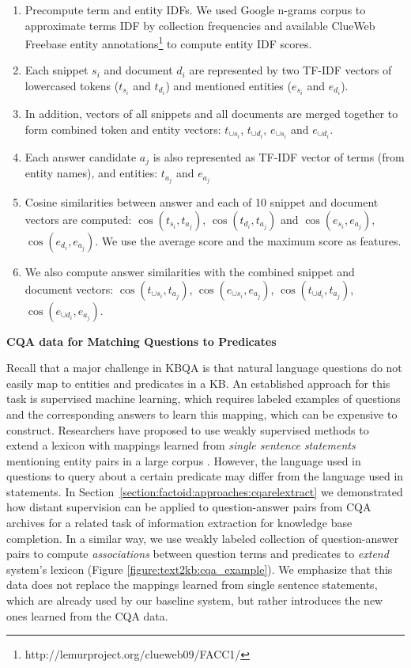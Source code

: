 \begin{enumerate}
\item Precompute term and entity IDFs. We used Google n-grams corpus to approximate terms IDF by collection frequencies and available ClueWeb Freebase entity annotations\footnote{http://lemurproject.org/clueweb09/FACC1/} to compute entity IDF scores.
\item Each snippet $s_i$ and document $d_i$ are represented by two TF-IDF vectors of lowercased tokens ($t_{s_i}$ and $t_{d_i}$) and mentioned entities ($e_{s_i}$ and $e_{d_i}$).
\item In addition, vectors of all snippets and all documents are merged together to form combined token and entity vectors: $t_{\cup s_i}$, $t_{\cup d_i}$, $e_{\cup s_i}$ and $e_{\cup d_i}$.
\item Each answer candidate $a_j$ is also represented as TF-IDF vector of terms (from entity names), and entities: $t_{a_j}$ and $e_{a_j}$
\item Cosine similarities between answer and each of 10 snippet and document vectors are computed: $\cos(t_{s_i}, t_{a_j})$, $\cos(t_{d_i}, t_{a_j})$ and $\cos(e_{s_i}, e_{a_j})$, $\cos(e_{d_i}, e_{a_j})$.
We use the average score and the maximum score as features.
\item We also compute answer similarities with the combined snippet and document vectors: $\cos(t_{\cup s_i}, t_{a_j})$, $\cos(e_{\cup s_i}, e_{a_j})$, $\cos(t_{\cup d_i}, t_{a_j})$, $\cos(e_{\cup d_i}, e_{a_j})$.
\end{enumerate}

\textbf{CQA data for Matching Questions to Predicates}

Recall that a major challenge in KBQA is that natural language questions do not easily  map to entities and predicates in a KB.
An established approach for this task is supervised machine learning, which requires labeled examples of questions and the corresponding answers to learn this mapping, which can be expensive to construct.
Researchers have proposed to use weakly supervised methods to extend a lexicon with mappings learned from \textit{single sentence statements} mentioning entity pairs in a large corpus \cite{YaoD14}.
However, the language used in questions to query about a certain predicate may differ from the language used in statements.
In Section~\ref{section:factoid:approaches:cqarelextract} we demonstrated how distant supervision can be applied to question-answer pairs from CQA archives for a related task of information extraction for knowledge base completion.
In a similar way, we use weakly labeled collection of question-answer pairs to compute {\em associations} between question terms and predicates to \textit{extend} system's lexicon (Figure \ref{figure:text2kb:cqa_example}).
We emphasize that this data does not replace the mappings learned from single sentence statements, which are already used by our baseline system, but rather introduces the new ones learned from the CQA data.


